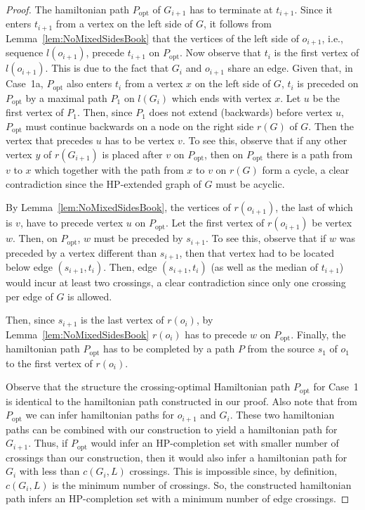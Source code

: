 \documentclass{myllncs-mixalis}
\begin{document}
\begin{proof}
The hamiltonian path $P_{\mathrm{opt}}$ of $G_{i+1}$ has to
terminate at $t_{i+1}$. Since it enters $t_{i+1}$ from a vertex on
the left side of $G$, it follows from
Lemma~\ref{lem:NoMixedSidesBook} that the vertices of the left side
of $o_{i+1}$, i.e., sequence $l(o_{i+1})$, precede $t_{i+1}$ on
$P_{\mathrm{opt}}$. Now observe that $t_i$ is the first vertex of
$l(o_{i+1})$. This is due to the fact that $G_i$ and $o_{i+1}$ share
an edge. Given that, in Case~1a, $P_{\mathrm{opt}}$ also enters
$t_i$ from a vertex $x$ on the left side of $G$, $t_i$ is preceded
on $P_{\mathrm{opt}}$ by a maximal path $P_1$ on $l(G_i)$ which ends
with vertex $x$. Let $u$ be the first vertex of $P_1$. Then, since
$P_1$ does not extend (backwards) before vertex $u$,
$P_{\mathrm{opt}}$ must continue backwards on a node on the right
side $r(G)$ of $G$. Then the vertex that precedes $u$ has to be
vertex $v$. To see this, observe that if any other vertex $y$  of
$r(G_{i+1})$ is placed after $v$ on $P_{\mathrm{opt}}$, then on
$P_{\mathrm{opt}}$ there is  a path from $v$ to $x$ which together
with the path from $x$ to $v$ on $r(G)$ form a cycle, a clear
contradiction since the HP-extended graph of $G$ must be acyclic.

By Lemma~\ref{lem:NoMixedSidesBook}, the vertices of $r(o_{i+1})$,
the last of which is $v$, have to precede vertex $u$ on
$P_{\mathrm{opt}}$. Let the first vertex of $r(o_{i+1})$ be vertex
$w$. Then, on $P_{\mathrm{opt}}$, $w$ must be preceded by $s_{i+1}$.
To see this, observe that if $w$ was preceded by  a vertex different
than $s_{i+1}$, then that vertex had to be located below edge
$(s_{i+1}, t_i)$. Then, edge $(s_{i+1}, t_i)$ (as well as the median
of $t_{i+1}$) would incur  at least two crossings, a clear
contradiction since  only one crossing per edge of $G$ is allowed.

Then, since $s_{i+1}$ is the last vertex of $r(o_i)$, by
Lemma~\ref{lem:NoMixedSidesBook} $r(o_i)$ has to precede $w$ on
$P_{\mathrm{opt}}$. Finally, the hamiltonian path $P_{\mathrm{opt}}$
has to be completed by a path $P$ from the source $s_1$ of $o_1$ to
the first vertex of $r(o_i)$.

Observe that the structure the crossing-optimal Hamiltonian path
$P_{\mathrm{opt}}$ for Case~1 is identical to the hamiltonian path
constructed in our proof. Also note that from $P_{\mathrm{opt}}$ we
can infer  hamiltonian paths for $o_{i+1}$ and $G_i$. These two
hamiltonian paths can be combined with our construction to yield a
hamiltonian path for $G_{i+1}$. Thus, if $P_{\mathrm{opt}}$ would
infer an HP-completion set with smaller number of crossings than our
construction, then it would also infer a hamiltonian path for $G_i$
with less than $c(G_i,L)$ crossings. This is impossible since, by
definition, $c(G_i,L)$ is the minimum number of crossings. So, the
constructed hamiltonian path infers an HP-completion set with a
minimum number of edge crossings.


\end{proof}
\end{document}
